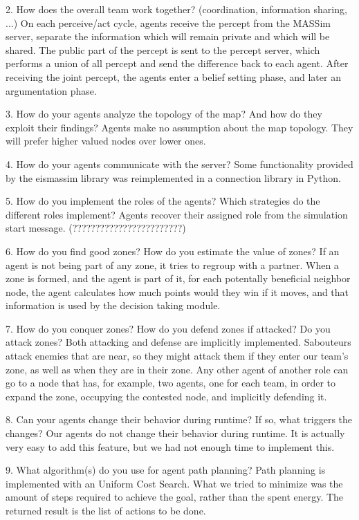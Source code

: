 2. How does the overall team work together? (coordination, information
sharing, ...) On each perceive/act cycle, agents receive the percept from the
MASSim server, separate the information which will remain private and which
will be shared.  The public part of the percept is sent to the percept server,
which performs a union of all percept and send the difference back to each
agent. After receiving the joint percept, the agents enter a belief setting
phase, and later an argumentation phase.


3. How do your agents analyze the topology of the map? And how do they exploit
their findings?  Agents make no assumption about the map topology. They will
prefer higher valued nodes over lower ones.

4. How do your agents communicate with the server?  Some functionality
provided by the eismassim library was reimplemented in a connection library in
Python.

5. How do you implement the roles of the agents? Which strategies do the
different roles implement?  Agents recover their assigned role from the
simulation start message.  (????????????????????????)

6. How do you find good zones? How do you estimate the value of zones?  If an
agent is not being part of any zone, it tries to regroup with a partner.  When
a zone is formed, and the agent is part of it, for each potentally beneficial
neighbor node, the agent calculates how much points would they win if it
moves, and that information is used by the decision taking module.

7. How do you conquer zones? How do you defend zones if attacked? Do you
attack zones?  Both attacking and defense are implicitly implemented.
Sabouteurs attack enemies that are near, so they might attack them if they
enter our team's zone, as well as when they are in their zone. Any other agent
of another role can go to a node that has, for example, two agents, one for
each team, in order to expand the zone, occupying the contested node, and
implicitly defending it.


8. Can your agents change their behavior during runtime? If so, what triggers
the changes?  Our agents do not change their behavior during runtime. It is
actually very easy to add this feature, but we had not enough time to
implement this.


9. What algorithm(s) do you use for agent path planning?  Path planning is
implemented with an Uniform Cost Search. What we tried to minimize was the
amount of steps required to achieve the goal, rather than the spent energy.
The returned result is the list of actions to be done.

